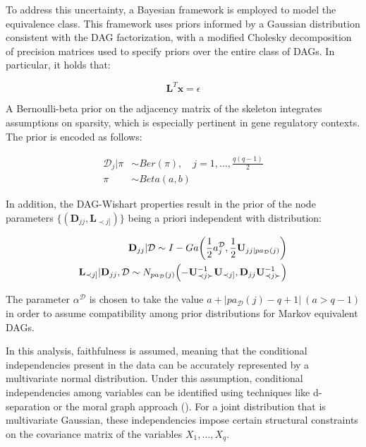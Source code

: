 \documentclass{report}
\begin{document}
To address this uncertainty, a Bayesian framework is employed to model the equivalence class. This framework uses priors informed by a Gaussian distribution consistent with the DAG factorization, with a modified Cholesky decomposition of precision matrices used to specify priors over the entire class of DAGs. In particular, it holds that:

$$
\mathbf{L}^T \mathbf{x} = \epsilon
$$

A Bernoulli-beta prior on the adjacency matrix of the skeleton integrates assumptions on sparsity, which is especially pertinent in gene regulatory contexts. The prior is encoded as follows:

\begin{align*}
	\mathcal{D}_j | \pi &\sim Ber(\pi), \quad j = 1, \ldots, \frac{q(q-1)}{2} \\
	\pi &\sim Beta(a, b)
\end{align*}

In addition, the DAG-Wishart properties result in the prior of the node parameters $\{(\mathbf{D}_{jj}, \mathbf{L}_{\prec j]})\}$ being a priori independent with distribution:

\begin{equation} 
	\begin{split}
		\mathbf{D}_{jj} | \mathcal{D} \sim I-Ga  \biggl( \frac{1}{2} a^{\mathcal{D}}_j, \frac{1}{2}\mathbf{U}_{jj | pa_{\mathcal{D}} (j)} \biggr ) \\
		\mathbf{L}_{\prec j]} | \mathbf{D}_{jj}, \mathcal{D} \sim N_{pa_{\mathcal{D}} (j)} \Bigl(- \mathbf{U}^{-1}_{\prec j \succ} \mathbf{U}_{\prec j ]}, \mathbf{D}_{jj}\mathbf{U}^{-1}_{\prec j \succ} \Bigr )
	\end{split}
\end{equation}

The parameter $\alpha^{\mathcal{D}}$ is chosen to take the value $a + \left| pa_{\mathcal{D}} (j) - q + 1 \right| \ (a > q - 1)$ in order to assume compatibility among prior distributions for Markov equivalent DAGs.

In this analysis, faithfulness is assumed, meaning that the conditional independencies present in the data can be accurately represented by a multivariate normal distribution. Under this assumption, conditional independencies among variables can be identified using techniques like d-separation or the moral graph approach (\citet{lauritzen1989graphical}). For a joint distribution that is multivariate Gaussian, these independencies impose certain structural constraints on the covariance matrix of the variables $X_1,\dots, X_q$.
\end{document}
